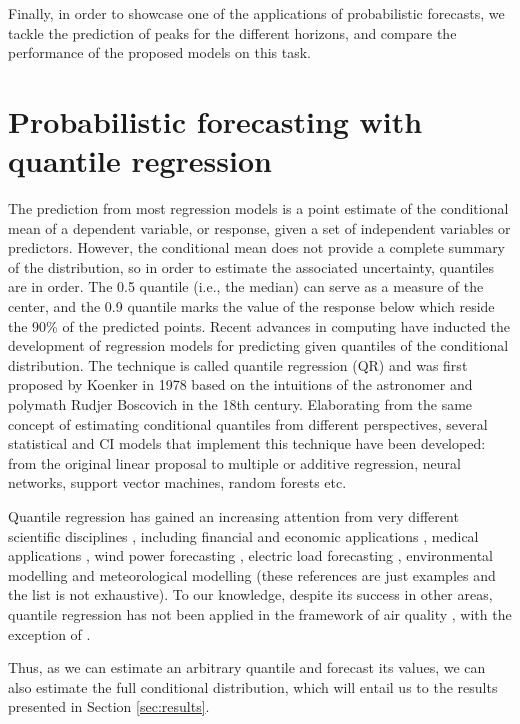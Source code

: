 \documentclass[a4paper,3p,sort&compress]{elsarticle}
\begin{document}
Finally, in order to showcase one of the applications of probabilistic
forecasts, we tackle the prediction of \no peaks for the different
horizons, and compare the performance of the proposed models on this
task. 

\section{Probabilistic forecasting with quantile regression}
\label{sec:probForec}

The prediction from most regression models is a point estimate of the
conditional mean of a dependent variable, or response, given a set of
independent variables or predictors. However, the conditional mean
does not provide a complete summary of the distribution, so in order
to estimate the associated uncertainty, quantiles are in order. The
0.5 quantile (i.e., the median) can serve as a measure of the center,
and the 0.9 quantile marks the value of the response below which
reside the 90\% of the predicted points. Recent advances in computing
have inducted the development of regression models for predicting
given quantiles of the conditional distribution. The technique is
called quantile regression (QR) and was first proposed by Koenker in
1978 \cite{koenker_quantile_2001} based on the intuitions of the
astronomer and polymath Rudjer Boscovich in the 18th
century. Elaborating from the same concept of estimating conditional
quantiles from different perspectives, several statistical and CI
models that implement this technique have been developed: from the
original linear proposal to multiple or additive regression, neural
networks, support vector machines, random forests etc.

Quantile regression has gained an increasing attention from very
different scientific disciplines \cite{yu_quantile_2003}, including
financial and economic applications \cite{ben_rejeb_financial_2016},
medical applications \cite{jang_quantile_2018}, wind power forecasting
\cite{wan_direct_2017}, electric load forecasting
\cite{lebotsa_short_2018}, environmental modelling
\cite{cade_gentle_2003} and meteorological modelling
\cite{baur_modelling_2004} (these references are just examples and the
list is not exhaustive). To our knowledge, despite its success in
other areas, quantile regression has not been applied in the framework
of air quality , with the exception of
\cite{martinezsilva_forecasting_2016}.

Thus, as we can estimate an arbitrary quantile and forecast its
values, we can also estimate the full conditional distribution, which
will entail us to the results presented in Section \ref{sec:results}.
\end{document}
